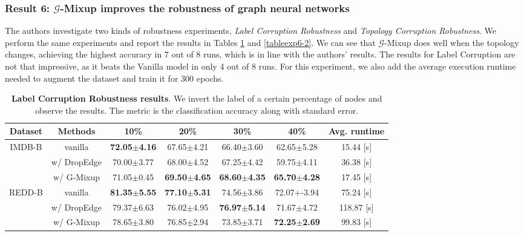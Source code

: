 \subsubsection{Result 6: $\mathcal{G}$-Mixup improves the robustness of graph neural networks}

The authors investigate two kinds of robustness experiments, \textit{Label Corruption Robustness} and \textit{Topology Corruption Robustness}. We perform the same experiments and report the results in Tables \ref{tableexp6-1} and \ref{tableexp6-2}. We can see that $\mathcal{G}$-Mixup does well when the topology changes, achieving the highest accuracy in 7 out of 8 runs, which is in line with the authors' results. The results for Label Corruption are not that impressive, as it beats the Vanilla model in only 4 out of 8 runs. For this experiment, we also add the average execution runtime needed to augment the dataset and train it for 300 epochs.

\begin{table}[]
\centering
\footnotesize
\begin{tabular}{ccccccc}
\hline
Dataset & Methods     & 10\%                 & 20\%                 & 30\%                 & 40\%                 & Avg. runtime   \\ \hline
IMDB-B  & vanilla     & \textbf{72.05$\pm$4.16} & 67.65$\pm$4.21          & 66.40$\pm$3.60          & 62.65$\pm$5.28          & 15.44 {[}s{]}  \\
        & w/ DropEdge & 70.00$\pm$3.77          & 68.00$\pm$4.52          & 67.25$\pm$4.42          & 59.75$\pm$4.11          & 36.38 {[}s{]}  \\
        & w/ G-Mixup  & 71.05$\pm$0.45          & \textbf{69.50$\pm$4.65} & \textbf{68.60$\pm$4.35} & \textbf{65.70$\pm$4.28} & 17.45 {[}s{]}  \\ \hline
REDD-B  & vanilla     & \textbf{81.35$\pm$5.55} & \textbf{77.10$\pm$5.31} & 74.56$\pm$3.86          & 72.07+-3.94          & 75.24 {[}s{]}  \\
        & w/ DropEdge & 79.37$\pm$6.63          & 76.02$\pm$4.95          & \textbf{76.97$\pm$5.14} & 71.67$\pm$4.72          & 118.87 {[}s{]} \\
        & w/ G-Mixup  & 78.65$\pm$3.80          & 76.85$\pm$2.94          & 73.85$\pm$3.71          & \textbf{72.25$\pm$2.69} & 99.83 {[}s{]}  \\ \hline
\end{tabular}
\caption{\textbf{Label Corruption Robustness results}. We invert the label of a certain percentage of nodes and observe the results. The metric is the classification accuracy along with standard error.}
\label{tableexp6-1}
\end{table}

